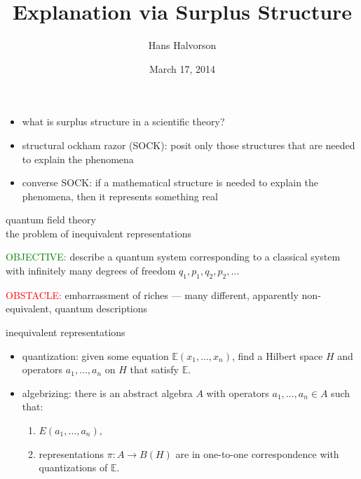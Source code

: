 \documentclass{beamer}
\title{Explanation via Surplus Structure}
\author{Hans Halvorson}
\date{March 17, 2014}
\begin{document}
\def\2{\mathcal}
\def\7{\mathfrak}
\begin{frame}

\maketitle

\end{frame}

\begin{frame}

\begin{itemize}
\item what is surplus structure in a scientific theory?
\item structural ockham razor (SOCK): posit only those structures that
  are needed to explain the phenomena
\item converse SOCK: if a mathematical structure is needed to explain
  the phenomena, then it represents something real
\end{itemize}

\end{frame}

\begin{frame}{quantum field theory \\ the problem of inequivalent representations}

  \textcolor{green}{OBJECTIVE:} describe a quantum system
  corresponding to a classical system with infinitely many degrees of
  freedom $q_1,p_1,q_2,p_2,\dots $

\bigskip

\textcolor{red}{OBSTACLE:} embarrassment of riches --- many
different, apparently non-equivalent, quantum descriptions




\end{frame}

\begin{frame}{inequivalent representations}

\begin{itemize}
\item quantization: given some equation $\mathbb{E}(x_1,\dots ,x_n)$,
  find a Hilbert space $H$ and operators $a_1,\dots ,a_n$ on $H$ that
  satisfy $\mathbb{E}$.
\item algebrizing: there is an abstract algebra $A$ with operators
  $a_1,\dots ,a_n\in A$ such that:
\begin{enumerate}
\item $E(a_1,\dots ,a_n)$,
\item representations $\pi :A\to B(H)$ are in one-to-one
  correspondence with quantizations of $\mathbb{E}$.
\end{enumerate}
\end{itemize}


\end{frame}
\end{document}
